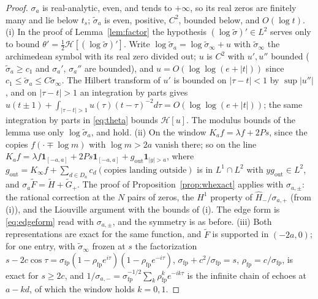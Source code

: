 \documentclass[11pt]{article}
\theoremstyle{definition}
\theoremstyle{remark}
\begin{document}
\begin{proof}
$\sigma_a$ is real-analytic, even, and tends to $+\infty$, so its real zeros are finitely many and lie below $t_s$; $\tilde\sigma_a$ is even, positive, $C^2$, bounded below, and $O(\log t)$. (i) In the proof of Lemma~\ref{lem:factor} the hypothesis $(\log\tilde\sigma)'\in L^2$ serves only to bound $\theta'=\tfrac12\mathcal H[(\log\tilde\sigma)']$. Write $\log\tilde\sigma_a=\log\tilde\sigma_\infty+u$ with $\tilde\sigma_\infty$ the archimedean symbol with its real zero divided out; $u$ is $C^2$ with $u',u''$ bounded ($\tilde\sigma_a\ge c_1$ and $\sigma_a'$, $\sigma_a''$ are bounded), and $u=O(\log\log(e+|t|))$ since $c_1\le\tilde\sigma_a\le C\tilde\sigma_\infty$. The Hilbert transform of $u'$ is bounded on $|\tau-t|<1$ by $\sup|u''|$, and on $|\tau-t|>1$ an integration by parts gives $u(t\pm1)+\int_{|\tau-t|>1}u(\tau)(t-\tau)^{-2}d\tau=O(\log\log(e+|t|))$; the same integration by parts in \eqref{eq:theta} bounds $\mathcal H[u]$. The modulus bounds of the lemma use only $\log\tilde\sigma_a$, and hold. (ii) On the window $K_af=\lambda f+2Ps$, since the copies $f(\cdot\mp\log m)$ with $\log m>2a$ vanish there; so on the line $K_af=\lambda f\mathbf 1_{[-a,a]}+2Ps\mathbf 1_{[-a,a]}+g_{\mathrm{out}}\mathbf 1_{|y|>a}$, where $g_{\mathrm{out}}=K_\infty f+\sum_{d\in D_a}c_d(\text{copies landing outside})$ is in $L^1\cap L^2$ with $yg_{\mathrm{out}}\in L^2$, and $\sigma_a\tilde F=\tilde H+\tilde G_+$. The proof of Proposition~\ref{prop:whexact} applies with $\sigma_{a,\pm}$: the rational correction at the $N$ pairs of zeros, the $H^1$ property of $\hat H_-/\sigma_{a,+}$ (from (i)), and the Liouville argument with the bounds of (i). The edge form is \eqref{eq:edgeform} read with $\sigma_{a,\pm}$, and the symmetry is as before. (iii) Both representations are exact for the same function, and $\tilde F$ is supported in $(-2a,0)$; for one entry, with $\tilde\sigma_\infty$ frozen at $s$ the factorization $s-2c\cos\tau=\sigma_{\mathrm{fp}}(1-\rho_{\mathrm{fp}}e^{i\tau})(1-\rho_{\mathrm{fp}}e^{-i\tau})$, $\sigma_{\mathrm{fp}}+c^2/\sigma_{\mathrm{fp}}=s$, $\rho_{\mathrm{fp}}=c/\sigma_{\mathrm{fp}}$, is exact for $s\ge2c$, and $1/\sigma_{a,-}=\sigma_{\mathrm{fp}}^{-1/2}\sum_k\rho_{\mathrm{fp}}^ke^{-ik\tau}$ is the infinite chain of echoes at $a-kd$, of which the window holds $k=0,1$.
\end{proof}
\end{document}
